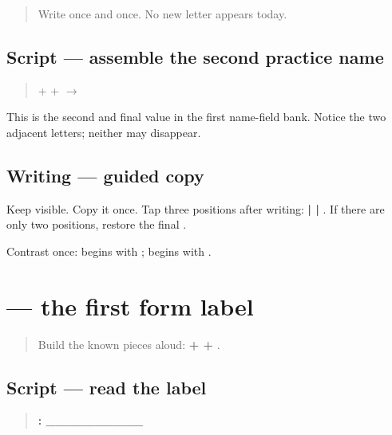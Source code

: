 \label{lesson:PA-W02-manan}



\begin{quote}
Write \textbf{} once and \textbf{} once. No new letter appears today.
\end{quote}

\subsection*{Script — assemble the second practice name}
\begin{quote}
\textbf{} + \textbf{} + \textbf{} $\to$ \textbf{}
\end{quote}

This is the second and final value in the first name-field bank. Notice the two adjacent \textbf{} letters; neither may disappear.

\subsection*{Writing — guided copy}

Keep \textbf{} visible. Copy it once. Tap three positions after writing: \textbf{ |  | }. If there are only two positions, restore the final \textbf{}.

\begin{tcolorbox}[breakable,colback=teal!4,colframe=teal!35!black,title={Before you move on}]
Contrast once: \textbf{} begins with \textbf{}; \textbf{} begins with \textbf{}.
\end{tcolorbox}
\section[\texorpdfstring{\pa{ਨਾਂ} (nāṁ)}{ਨਾਂ (nāṁ)}]{ — the first form label}

\label{lesson:PA-W02-name-label}



\begin{quote}
Build the known pieces aloud: \textbf{ +  + }.
\end{quote}

\subsection*{Script — read the label}
\begin{quote}
\textbf{: \_\_\_\_\_\_\_\_\_\_}
\end{quote}

